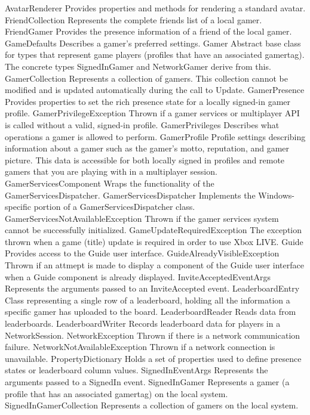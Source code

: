 	AvatarRenderer	Provides properties and methods for rendering a standard avatar.
	FriendCollection	Represents the complete friends list of a local gamer.
	FriendGamer	Provides the presence information of a friend of the local gamer.
	GameDefaults	Describes a gamer's preferred settings.
	Gamer	 Abstract base class for types that represent game players (profiles that have an associated gamertag). The concrete types SignedInGamer and NetworkGamer derive from this.
	GamerCollection	Represents a collection of gamers. This collection cannot be modified and is updated automatically during the call to Update.
	GamerPresence	Provides properties to set the rich presence state for a locally signed-in gamer profile.
	GamerPrivilegeException	Thrown if a gamer services or multiplayer API is called without a valid, signed-in profile.
	GamerPrivileges	Describes what operations a gamer is allowed to perform.
	GamerProfile	 Profile settings describing information about a gamer such as the gamer's motto, reputation, and gamer picture. This data is accessible for both locally signed in profiles and remote gamers that you are playing with in a multiplayer session.
	GamerServicesComponent	Wraps the functionality of the GamerServicesDispatcher.
	GamerServicesDispatcher	Implements the Windows-specific portion of a GamerServicesDispatcher class.
	GamerServicesNotAvailableException	Thrown if the gamer services system cannot be successfully initialized.
	GameUpdateRequiredException	The exception thrown when a game (title) update is required in order to use Xbox LIVE.
	Guide	Provides access to the Guide user interface.
	GuideAlreadyVisibleException	Thrown if an attmept is made to display a component of the Guide user interface when a Guide component is already displayed.
	InviteAcceptedEventArgs	Represents the arguments passed to an InviteAccepted event.
	LeaderboardEntry	Class representing a single row of a leaderboard, holding all the information a specific gamer has uploaded to the board.
	LeaderboardReader	Reads data from leaderboards.
	LeaderboardWriter	Records leaderboard data for players in a NetworkSession.
	NetworkException	Thrown if there is a network communication failure.
	NetworkNotAvailableException	Thrown if a network connection is unavailable.
	PropertyDictionary	Holds a set of properties used to define presence states or leaderboard column values.
	SignedInEventArgs	Represents the arguments passed to a SignedIn event.
	SignedInGamer	Represents a gamer (a profile that has an associated gamertag) on the local system.
	SignedInGamerCollection	Represents a collection of gamers on the local system.
